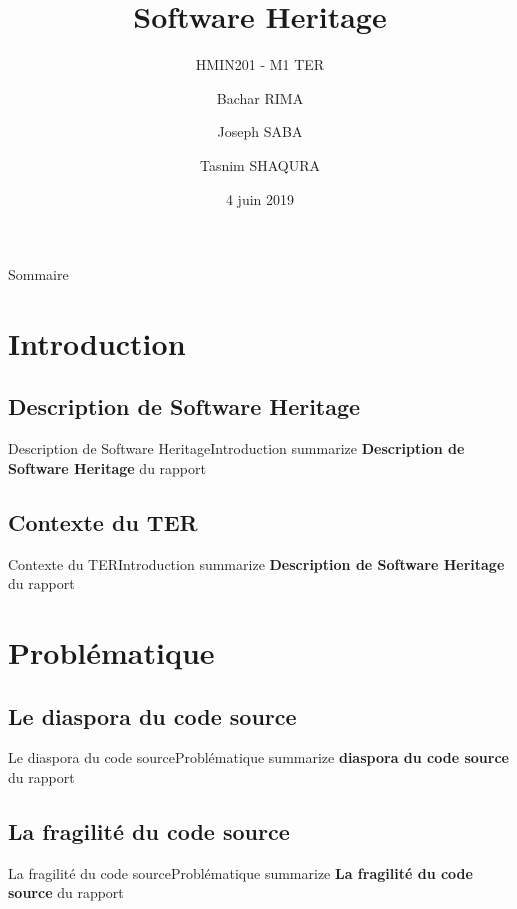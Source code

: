 \documentclass{beamer}
\title{Software Heritage}
\subtitle{HMIN201 - M1 TER}
\author{Bachar RIMA \and Joseph SABA \and Tasnim SHAQURA}
\institute[UM]{M1 AIGLE}
\date{4 juin 2019}
\begin{document}
\begin{frame}
  \titlepage
\end{frame}

\begin{frame}{Sommaire}
  \tableofcontents[hideallsubsections]
\end{frame}

\section{Introduction}

  \subsection{Description de Software Heritage}
    \begin{frame}{Description de Software Heritage}{Introduction}
      summarize \textbf{Description de Software Heritage} du rapport
    \end{frame}

  \subsection{Contexte du TER}
    \begin{frame}{Contexte du TER}{Introduction}
      summarize \textbf{Description de Software Heritage} du rapport
    \end{frame}

\section{Problématique}

  \subsection{Le diaspora du code source}
    \begin{frame}{Le diaspora du code source}{Problématique}
      summarize \textbf{diaspora du code source} du rapport
    \end{frame}

  \subsection{La fragilité du code source}
    \begin{frame}{La fragilité du code source}{Problématique}
    summarize \textbf{La fragilité du code source} du rapport
    \end{frame}
\end{document}
